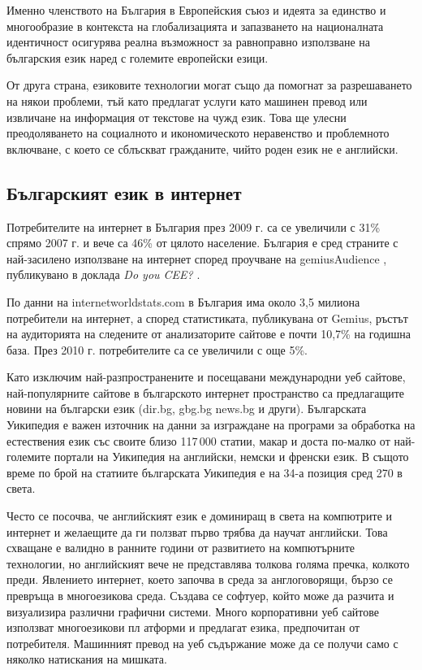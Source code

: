 \documentclass[]{../../metanetpaper}
\begin{document}
\begin{multicols}{2}
Именно членството на България в Европейския съюз и идеята за единство и многообразие в контекста на глобализацията и запазването на националната идентичност осигурява реална възможност за равноправно използване на българския език наред с големите европейски езици. 

От друга страна, езиковите технологии могат също да помогнат за разрешаването на някои проблеми, тъй като предлагат услуги като машинен превод или извличане на информация от текстове на чужд език. Това ще улесни преодоляването на социалното и икономическото неравенство и проблемното включване, с което се сблъскват гражданите, чийто роден език не е английски.


\subsection{Българският език в интернет}

Потребителите на интернет в България през 2009 г. са се увеличили с 31\% спрямо 2007 г. и вече са 46\% от цялото население. България е сред страните с най-засилено използване на интернет според проучване на gemiusAudience \cite{gemius}, публикувано в доклада \textit{Do you CEE?} \cite{inetcee}.
 
По данни на internetworldstats.com \cite{inetworldstat} в България има около 3,5 милиона потребители на интернет, а според статистиката, публикувана от Gemius, ръстът на аудиторията на следените от анализаторите сайтове е почти 10,7\% на годишна база. През 2010 г. потребителите са се увеличили с още 5\%. 

Като изключим най-разпространените и посещавани международни уеб сайтове, най-популярните сайтове в българското интернет пространство са предлагащите новини на български език (dir.bg, gbg.bg news.bg и други). Българската Уикипедия е важен източник на данни за изграждане на програми за обработка на естествения език със своите близо 117\,000 статии, макар и доста по-малко от най-големите портали на Уикипедия на английски, немски и френски език. В същото време по брой на статиите българската Уикипедия е на 34-а \cite{metadata} позиция сред 270 в света. 

Често се посочва, че английският език е доминиращ в света на компютрите и интернет и желаещите да ги ползват първо трябва да научат английски. Това схващане е валидно в ранните години от развитието на компютърните технологии, но английският вече не представлява толкова голяма пречка, колкото преди. Явлението интернет, което започва в среда за англоговорящи, бързо се превръща в многоезикова среда. Създава се софтуер, който може да разчита и визуализира различни графични системи. Много корпоративни уеб сайтове използват многоезикови пл
 атформи и предлагат езика, предпочитан от потребителя. Машинният превод на уеб съдържание може да се получи само с няколко натискания на мишката.


\end{multicols}
\end{document}
